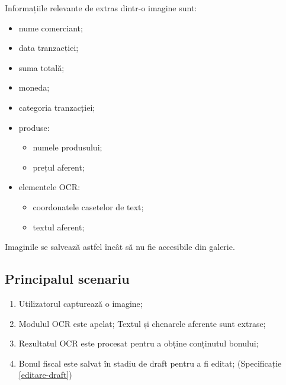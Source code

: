 Informațiile relevante de extras dintr-o imagine sunt:
\begin{multicols}{3}
\begin{itemize}
\item
  nume comerciant;
\item
  data tranzacției;
\item
  suma totală;
\item
  moneda;
\item
  categoria tranzacției;
\item
  produse:
  \begin{itemize}
  \item
    numele produsului;
  \item
    prețul aferent;
  \end{itemize}
\item
  elementele OCR:
  \begin{itemize}
  \item
    coordonatele casetelor de text;
  \item
    textul aferent;
  \end{itemize}
\end{itemize}
\end{multicols}

Imaginile se salvează astfel încât să nu fie accesibile din galerie.

\subsection*{Principalul scenariu}\label{principalul-scenariu}

\begin{enumerate}
\item
  Utilizatorul capturează o imagine;
\item
  Modulul OCR este apelat; Textul și chenarele aferente sunt extrase;
\item
  Rezultatul OCR este procesat pentru a obține conținutul bonului;
\item
  Bonul fiscal este salvat în stadiu de draft pentru a fi editat;
  (Specificație \ref{editare-draft})
\end{enumerate}

